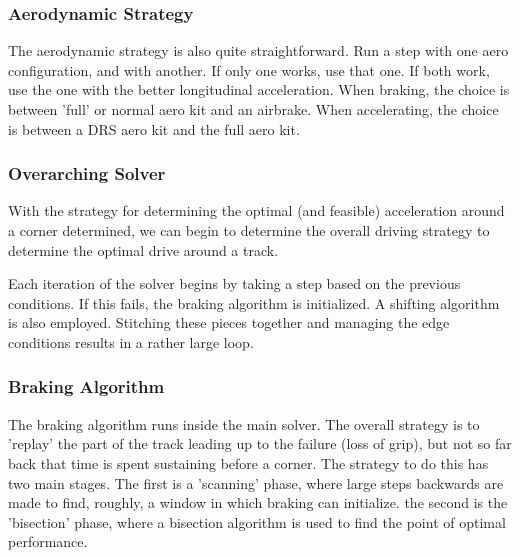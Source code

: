 \documentclass{article}
\begin{document}
\subsubsection{Aerodynamic Strategy}

The aerodynamic strategy is also quite straightforward. Run a step with one aero configuration, and with another. If only one works, use that one. If both work, use the one with the better longitudinal acceleration. When braking, the choice is between 'full' or normal aero kit and an airbrake. When accelerating, the choice is between a DRS aero kit and the full aero kit.

\subsubsection{Overarching Solver}

With the strategy for determining the optimal (and feasible) acceleration around a corner determined, we can begin to determine the overall driving strategy to determine the optimal drive around a track.

Each iteration of the solver begins by taking a step based on the previous conditions. If this fails, the braking algorithm is initialized. A shifting algorithm is also employed. Stitching these pieces together and managing the edge conditions results in a rather large loop.

\subsubsection{Braking Algorithm}
The braking algorithm runs inside the main solver. The overall strategy is to 'replay' the part of the track leading up to the failure (loss of grip), but not so far back that time is spent sustaining before a corner. The strategy to do this has two main stages. The first is a 'scanning' phase, where large steps backwards are made to find, roughly, a window in which braking can initialize. the second is the 'bisection' phase, where a bisection algorithm is used to find the point of optimal performance.
\end{document}
